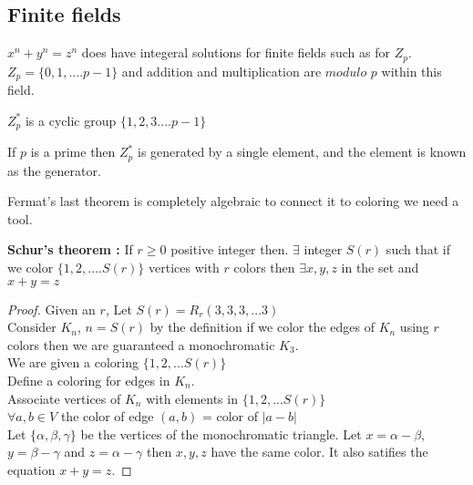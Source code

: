 \subsection{Finite fields}
$x^n +y^n = z^n$ does have integeral solutions for finite fields such as for $Z_p$.\\
$Z_p = \{0,1,....p-1\}$ and addition and multiplication are $modulo$ $p$ within this field.\\

\begin{definition}
$Z_p^*$ is a cyclic group $\{1,2,3....p-1\}$
\end{definition}

\begin{claim}
If $p$ is a prime then $Z_p^*$ is generated by a single element, and the element is known as the generator.
\end{claim}

Fermat's last theorem is completely algebraic to connect it to coloring we need a tool.
\begin{theorem}
\textbf{Schur's theorem :} If $r \geq 0$ positive integer then. $\exists$ integer $S(r)$ such that if we color $\{1,2,....S(r)\}$ vertices with $r$ colors then $\exists x,y,z$ in the set and $x+y =z$
\end{theorem}
\begin{proof}
Given an $r$, Let $S(r) = R_r(3,3,3,...3)$\\
Consider $K_n$, $n = S(r)$ by the definition if we color the edges of $K_n$ using $r$ colors then we are guaranteed a monochromatic $K_3$.\\
We are given a coloring $\{1,2,...S(r)\}$\\
Define a coloring for edges in $K_n$.\\
Associate vertices of $K_n$ with elements in $\{1,2,...S(r)\}$ \\
$\forall a,b\in V$ the color of edge $(a,b) $ = color of $|a-b|$\\

Let $\{\alpha, \beta,\gamma\}$ be the vertices of the monochromatic triangle.
Let $x = \alpha - \beta$, $y = \beta - \gamma$ and $z = \alpha - \gamma$ then $x,y,z$ have the same color.
It also satifies the equation $x+y =z$.
 
\end{proof}

